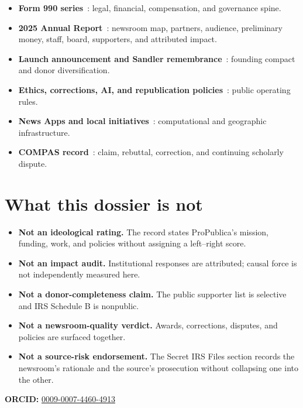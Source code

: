 \documentclass[10pt,letterpaper,twocolumn]{article}
\begin{document}
\begin{itemize}
\item \textbf{Form 990 series}~\citep{pp990}: legal, financial, compensation, and governance spine.
\item \textbf{2025 Annual Report}~\citep{pp2025}: newsroom map, partners, audience, preliminary money, staff, board, supporters, and attributed impact.
\item \textbf{Launch announcement and Sandler remembrance}~\citep{pplaunch,ppsandler}: founding compact and donor diversification.
\item \textbf{Ethics, corrections, AI, and republication policies}~\citep{ppethics,ppcorrections,ppai,pprepublish}: public operating rules.
\item \textbf{News Apps and local initiatives}~\citep{ppnewsapps,pplocal}: computational and geographic infrastructure.
\item \textbf{COMPAS record}~\citep{ppmachinebias,ppcompasresponse,rudin2019}: claim, rebuttal, correction, and continuing scholarly dispute.
\end{itemize}

\section{What this dossier is not}

\begin{itemize}
\item \textbf{Not an ideological rating.} The record states ProPublica's mission, funding, work, and policies without assigning a left--right score.
\item \textbf{Not an impact audit.} Institutional responses are attributed; causal force is not independently measured here.
\item \textbf{Not a donor-completeness claim.} The public supporter list is selective and IRS Schedule B is nonpublic.
\item \textbf{Not a newsroom-quality verdict.} Awards, corrections, disputes, and policies are surfaced together.
\item \textbf{Not a source-risk endorsement.} The Secret IRS Files section records the newsroom's rationale and the source's prosecution without collapsing one into the other.
\end{itemize}

\vspace{0.4em}
\noindent\textbf{ORCID:} \href{https://orcid.org/0009-0007-4460-4913}{0009-0007-4460-4913}


{\footnotesize}
\end{document}
